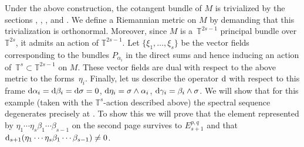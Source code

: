 \documentclass[10pt,a4paper]{amsart}
\numberwithin{equation}{section}
\theoremstyle{definition}
\begin{document}
Under the above construction, the cotangent bundle of $M$ is trivialized by the sections , , \smash{$\sigma:=\pi^*\overline{\sigma}$},  and . We define a Riemannian metric on $M$ by demanding that this trivialization is orthonormal. Moreover, since $M$ is a~$\mathbb{T}^{2s-1}$ principal bundle over $\mathbb{T}^{2s}$, it admits an action of $\mathbb{T}^{2s-1}$. Let $\{\xi_1,\dots,\xi_s\}$ be the vector fields corresponding to the bundles $P_{\alpha_i}$ in the direct sums and hence inducing an action of~${\mathbb{T}^s\subset\mathbb{T}^{2s-1}}$ on $M$. These vector fields are dual with respect to the above metric to the forms~$\eta_i$. Finally, let us describe the operator ${\rm d}$ with respect to this frame
${\rm d}\alpha_i={\rm d}\beta_i={\rm d}\sigma=0$, ${\rm d}\eta_i=\sigma\wedge\alpha_i$, ${\rm d}\gamma_i=\beta_i\wedge\sigma$.
We will show that for this example (taken with the $\mathbb{T}^s$-action described above) the spectral sequence degenerates precisely at . To show this we will prove that the element represented by $\eta_1\cdots \eta_s\beta_1\cdots \beta_{s-1}$ on the second page survives to $E^{p,q}_{s+1}$ and that ${\rm d}_{s+1}(\eta_1\cdots \eta_s\beta_1\cdots \beta_{s-1})\neq 0$.
\end{document}
